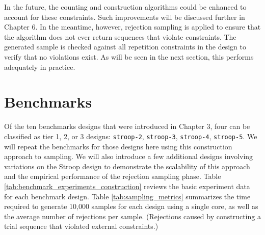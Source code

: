 In the future, the counting and construction algorithms could be enhanced to account for these constraints. Such improvements will be discussed further in Chapter 6. In the meantime, however, rejection sampling is applied to ensure that the algorithm does not ever return sequences that violate constraints. The generated sample is checked against all repetition constraints in the design to verify that no violations exist. As will be seen in the next section, this performs adequately in practice.


\section{Benchmarks}

Of the ten benchmarks designs that were introduced in Chapter 3, four can be classified as tier 1, 2, or 3 designs: \texttt{stroop-2}, \texttt{stroop-3}, \texttt{stroop-4}, \texttt{stroop-5}. We will repeat the benchmarks for those designs here using this construction approach to sampling. We will also introduce a few additional designs involving variations on the Stroop design to demonstrate the scalability of this approach and the empirical performance of the rejection sampling phase. Table \ref{tab:benchmark_experiments_construction} reviews the basic experiment data for each benchmark design. Table \ref{tab:sampling_metrics} summarizes the time required to generate 10,000 samples for each design using a single core, as well as the average number of rejections per sample. (Rejections caused by constructing a trial sequence that violated external constraints.)


